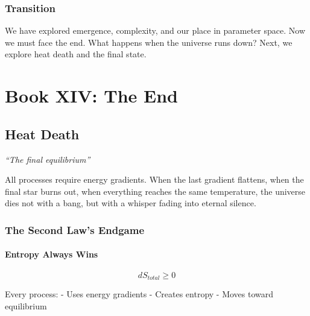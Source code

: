 \documentclass[
  11pt,
  letterpaper,
  twoside,
  openright]{book}
\begin{document}
\section{Transition}\label{transition-42}

We have explored emergence, complexity, and our place in parameter
space. Now we must face the end. What happens when the universe runs
down? Next, we explore heat death and the final state.

\part{Book XIV: The End}

\chapter{Heat Death}\label{sec-heat-death}

\emph{``The final equilibrium''}

\begin{tcolorbox}[enhanced jigsaw, coltitle=black, colbacktitle=quarto-callout-note-color!10!white, toprule=.15mm, colframe=quarto-callout-note-color-frame, arc=.35mm, opacityback=0, bottomtitle=1mm, toptitle=1mm, breakable, colback=white, titlerule=0mm, opacitybacktitle=0.6, title=\textcolor{quarto-callout-note-color}{\faInfo}\hspace{0.5em}{Key Revelation}, rightrule=.15mm, bottomrule=.15mm, leftrule=.75mm, left=2mm]

All processes require energy gradients. When the last gradient flattens,
when the final star burns out, when everything reaches the same
temperature, the universe dies not with a bang, but with a whisper
fading into eternal silence.

\end{tcolorbox}

\section{The Second Law's Endgame}\label{the-second-laws-endgame}

\subsection{Entropy Always Wins}\label{entropy-always-wins}

\[
dS_{total} \geq 0
\]

Every process: - Uses energy gradients - Creates entropy - Moves toward
equilibrium
\end{document}
